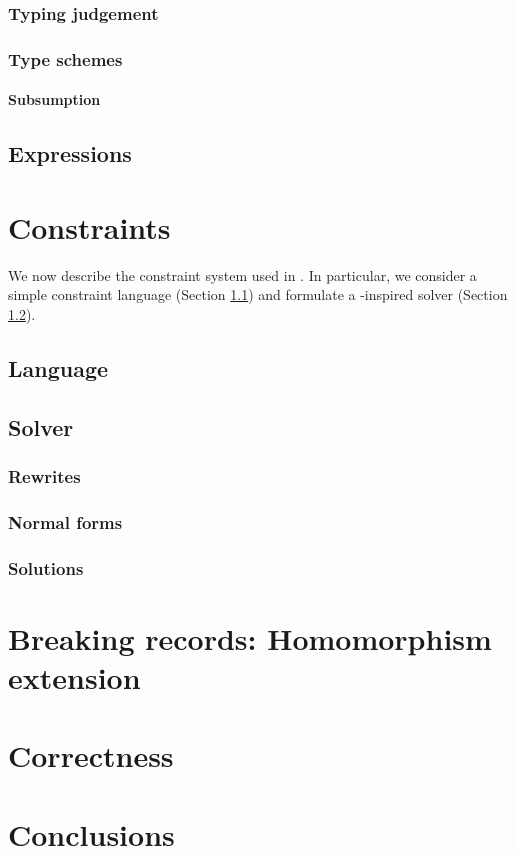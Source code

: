 \subsubsection{Typing judgement}

\subsubsection{Type schemes}

\paragraph{Subsumption}

\subsection{Expressions}
\label{subsec:expressions}

\section{Constraints}
\label{sec:constraints}

We now describe the constraint system used in \inference{}. In particular, we consider a simple constraint language (Section \ref{subsec:cstr-language}) and formulate a \mlstruct{}-inspired solver (Section \ref{subsec:cstr-solver}). 

\subsection{Language}
\label{subsec:cstr-language}

\subsection{Solver}
\label{subsec:cstr-solver}

\subsubsection{Rewrites}

\subsubsection{Normal forms}

\subsubsection{Solutions}

\section{Breaking records: Homomorphism extension}

\section{Correctness}
\label{sec:correctness}

\section{Conclusions}
\label{sec:conclusions}


